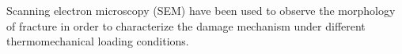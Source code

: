 



Scanning electron microscopy (SEM) have been used to observe the morphology of fracture in order to characterize the damage mechanism under different thermomechanical loading conditions.


